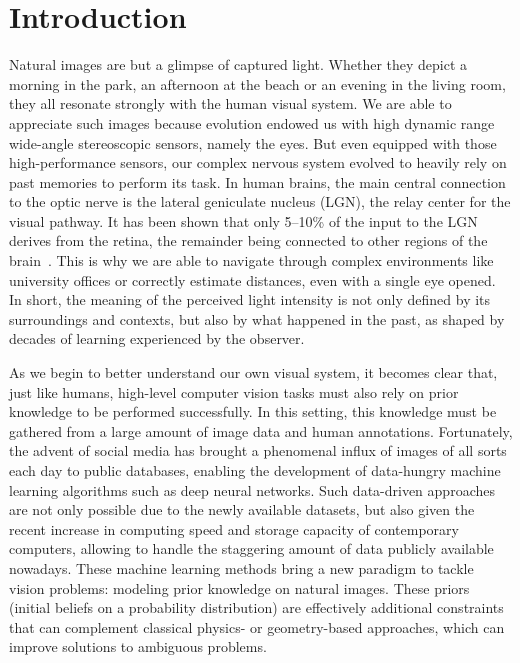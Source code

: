 \chapter*{Introduction}         %

Natural images are but a glimpse of captured light. Whether they depict a morning in the park, an afternoon at the beach or an evening in the living room, they all resonate strongly with the human visual system. We are able to appreciate such images because evolution endowed us with high dynamic range wide-angle stereoscopic sensors, namely the eyes. But even equipped with those high-performance sensors, our complex nervous system evolved to heavily rely on past memories to perform its task. In human brains, the main central connection to the optic nerve is the lateral geniculate nucleus (LGN), the relay center for the visual pathway. It has been shown that only 5--10\% of the input to the LGN derives from the retina, the remainder being connected to other regions of the brain~\cite{van2000relative}. This is why we are able to navigate through complex environments like university offices or correctly estimate distances, even with a single eye opened. In short, the meaning of the perceived light intensity is not only defined by its surroundings and contexts, but also by what happened in the past, as shaped by decades of learning experienced by the observer. 

As we begin to better understand our own visual system, it becomes clear that, just like humans, high-level computer vision tasks must also rely on prior knowledge to be performed successfully. In this setting, this knowledge must be gathered from a large amount of image data and human annotations. Fortunately, the advent of social media has brought a phenomenal influx of images of all sorts each day to public databases, enabling the development of data-hungry machine learning algorithms such as deep neural networks. Such data-driven approaches are not only possible due to the newly available datasets, but also given the recent increase in computing speed and storage capacity of contemporary computers, allowing to handle the staggering amount of data publicly available nowadays. These machine learning methods bring a new paradigm to tackle vision problems: modeling prior knowledge on natural images. These priors (initial beliefs on a probability distribution) are effectively additional constraints that can complement classical physics- or geometry-based approaches, which can improve solutions to ambiguous problems. 

